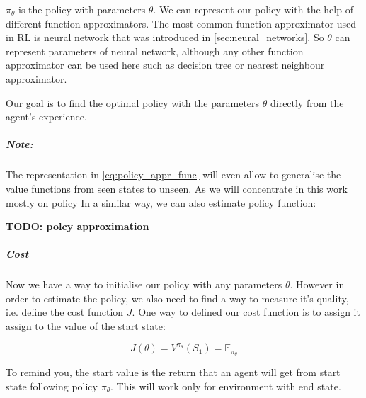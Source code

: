 $\pi_{\theta}$ is the policy with parameters $\theta$. We can represent our policy
with the help of different function approximators. The most common function
approximator used in RL is neural network that was introduced in \autoref{sec:neural_networks}.
So $\theta$ can represent parameters of neural network, although any other function approximator
can be used here such as decision tree or nearest neighbour approximator.

Our goal is to find the optimal policy with the parameters $\theta$
directly from the agent's experience.


\subparagraph{Note:}
The representation in \ref{eq:policy_appr_func} will even allow to generalise
the value functions from seen states to unseen.
As we will concentrate in this work mostly on policy
In a similar way, we can also estimate policy function:



\textbf{TODO: polcy approximation}





\subparagraph{Cost} Now we have a way to initialise our policy with any parameters $\theta$.
However in order to estimate the policy, we also need to find a way
to measure it's quality, i.e. define the cost function $J$.
One way to defined our cost function is to assign it
assign to the value of the start state:

\begin{equation}
	J(\theta) = V^{\pi_{\theta}}(S_1) = \mathbb{E}_{\pi_{\theta}}
\end{equation}

To remind you, the start value is the return that an agent will get from start state
following policy $\pi_{\theta}$. This will work only for environment with end state.


